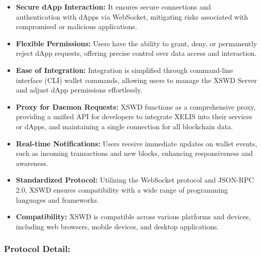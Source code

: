 \documentclass[10pt,a4paper,twocolumn]{article}
\begin{document}
\begin{itemize}

\item \textbf{Secure dApp Interaction:} It ensures secure connections and authentication with dApps via WebSocket, mitigating risks associated with compromised or malicious applications.\\

\item \textbf{Flexible Permissions:} Users have the ability to grant, deny, or permanently reject dApp requests, offering precise control over data access and interaction.\\

\item \textbf{Ease of Integration:} Integration is simplified through command-line interface (CLI) wallet commands, allowing users to manage the XSWD Server and adjust dApp permissions effortlessly.\\

\item \textbf{Proxy for Daemon Requests:} XSWD functions as a comprehensive proxy, providing a unified API for developers to integrate XELIS into their services or dApps, and maintaining a single connection for all blockchain data.\\

\item \textbf{Real-time Notifications:} Users receive immediate updates on wallet events, such as incoming transactions and new blocks, enhancing responsiveness and awareness.\\

\item \textbf{Standardized Protocol:} Utilizing the WebSocket protocol and JSON-RPC 2.0, XSWD ensures compatibility with a wide range of programming languages and frameworks.\\

\item \textbf{Compatibility:} XSWD is compatible across various platforms and devices, including web browsers, mobile devices, and desktop applications.\\
\end{itemize}
\subsubsection{Protocol Detail:}
\end{document}
